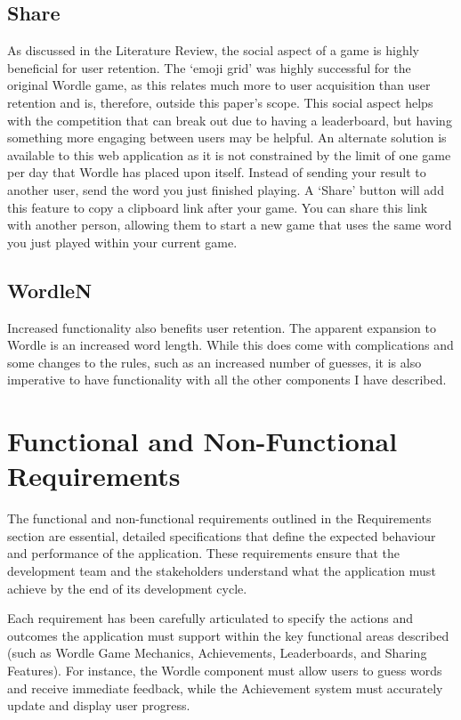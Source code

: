 \subsection{Share}
As discussed in the Literature Review, the social aspect of a game is highly beneficial for user retention. The ‘emoji grid’ was highly successful for the original Wordle game, as this relates much more to user acquisition than user retention and is, therefore, outside this paper's scope. This social aspect helps with the competition that can break out due to having a leaderboard, but having something more engaging between users may be helpful. An alternate solution is available to this web application as it is not constrained by the limit of one game per day that Wordle has placed upon itself. Instead of sending your result to another user, send the word you just finished playing. A ‘Share’ button will add this feature to copy a clipboard link after your game. You can share this link with another person, allowing them to start a new game that uses the same word you just played within your current game.

\subsection{WordleN}
Increased functionality also benefits user retention. The apparent expansion to Wordle is an increased word length. While this does come with complications and some changes to the rules, such as an increased number of guesses, it is also imperative to have functionality with all the other components I have described.

\section{Functional and Non-Functional Requirements}
The functional and non-functional requirements outlined in the Requirements section are essential, detailed specifications that define the expected behaviour and performance of the application. These requirements ensure that the development team and the stakeholders understand what the application must achieve by the end of its development cycle.

Each requirement has been carefully articulated to specify the actions and outcomes the application must support within the key functional areas described (such as Wordle Game Mechanics, Achievements, Leaderboards, and Sharing Features). For instance, the Wordle component must allow users to guess words and receive immediate feedback, while the Achievement system must accurately update and display user progress.

